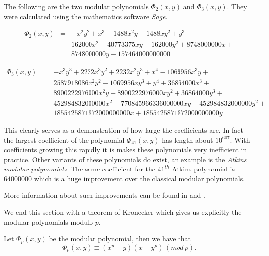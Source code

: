\begin{ex}
 The following are the two modular polynomials $\Phi_2(x,y)$ and $\Phi_3(x,y)$. They were
calculated using the mathematics software \emph{Sage}. 

\begin{eqnarray}
 \Phi_2(x,y) &=& -x^2y^2 + x^3 + 1488x^2y + 1488xy^2 + y^3 -\nonumber \\
	      && 162000x^2 + 40773375xy - 162000y^2 + 8748000000x +\nonumber \\
	      && 8748000000y - 157464000000000 \nonumber
\end{eqnarray}

\begin{eqnarray}
  \Phi_3(x,y) &=& -x^3y^3 + 2232x^3y^2 + 2232x^2y^3 + x^4 - 1069956x^3y +\nonumber \\
	      &&  2587918086x^2y^2-1069956xy^3 + y^4 + 36864000x^3 + \nonumber \\ 
	      &&  8900222976000x^2y + 8900222976000xy^2+36864000y^3 +\nonumber \\
	      &&  452984832000000x^2 - 770845966336000000xy + 452984832000000y^2+\nonumber \\
	      &&  1855425871872000000000x + 1855425871872000000000y \nonumber
\end{eqnarray}

This clearly serves as a demonstration of how large the coefficients are. In fact the largest
coefficient of the polynomial $\Phi_{41}(x,y)$ has length about $10^{607}$. With coefficients growing this
rapidly it is makes these polynomials very inefficient in practice. Other variants of these polynomials
do exist, an example is the \emph{Atkins modular polynomials}. The same coefficient for the $41^{th}$ Atkins
polynomial is $64000000$ which is a huge improvement over the classical modular polynomials.

More information about such improvements can be found in \cite{Handbook} and \cite{Blake}.
\end{ex}


We end this section with a theorem of Kronecker which gives us explicitly the modular polynomials
modulo $p$.
\begin{thm} \label{kroenecker}
 Let $\Phi_p(x,y)$ be the modular polynomial, then we have that
$$ \Phi_p(x,y) \equiv (x^p-y)(x-y^p)\,(mod\,p).$$
\end{thm}

